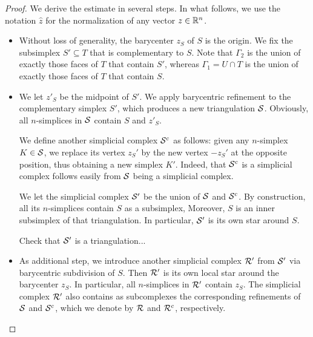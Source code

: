 \documentclass[10pt,a4paper]{article}
\newcommand{\mwl}[1]{{\color{red}#1}}
\begin{document}
\begin{proof}
    We derive the estimate in several steps. 
    In what follows, we use the notation $\hat z$ for the normalization of any vector $z \in {\mathbb R}^{n}$.
    \begin{itemize}
        \item 
        Without loss of generality, the barycenter $z_{S}$ of $S$ is the origin. 
        We fix the subsimplex $S' \subseteq T$ that is complementary to $S$.
        Note that ${\Gamma_2}$ is the union of exactly those faces of $T$ that contain $S'$,
        whereas ${\Gamma_1} = U \cap T$ is the union of exactly those faces of $T$ that contain $S$. 
        
        
        \item 
        We let $z'_{S}$ be the midpoint of $S'$. 
        We apply barycentric refinement to the complementary simplex $S'$, which produces a new triangulation ${\mathcal S}$. 
        Obviously, all $n$-simplices in ${\mathcal S}$ contain $S$ and $z'_{S}$.
        
        We define another simplicial complex ${\mathcal S}^c$ as follows:
        given any $n$-simplex $K \in {\mathcal S}$, 
        we replace its vertex $z_{S}'$ by the new vertex $-z_{S}'$ at the opposite position,
        thus obtaining a new simplex $K'$. 
        Indeed, that ${\mathcal S}^c$ is a simplicial complex follows easily from ${\mathcal S}$ being a simplicial complex. 
        
        We let the simplicial complex ${\mathcal S}'$ be the union of ${\mathcal S}$ and ${\mathcal S}^c$. 
        By construction, all its $n$-simplices contain $S$ as a subsimplex,
        Moreover, $S$ is an inner subsimplex of that triangulation. 
        In particular, ${\mathcal S}'$ is its own star around $S$.
        
        \mwl{Check that ${\mathcal S}'$ is a triangulation...}
        
        \item 
        As additional step, we introduce another simplicial complex ${\mathcal R}'$ from ${\mathcal S}'$ via barycentric subdivision of $S$.
        Then ${\mathcal R}'$ is its own local star around the barycenter $z_S$.
        In particular, all $n$-simplices in ${\mathcal R}'$ contain $z_{S}$. 
        The simplicial complex ${\mathcal R}'$ also contains as subcomplexes the corresponding refinements of ${\mathcal S}$ and ${\mathcal S}^{c}$, 
        which we denote by ${\mathcal R}$ and ${\mathcal R}^{c}$, respectively.
        

\end{itemize}
\end{proof}
\end{document}
